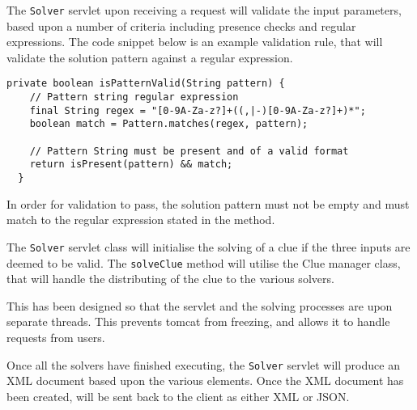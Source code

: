 The \texttt{Solver} servlet upon receiving a request will validate the input 
parameters, based upon a number of criteria including presence checks and 
regular expressions. The code snippet below is an example validation rule, that 
will validate the solution pattern against a regular expression.

\begin{lstlisting}[caption={isPatternValid deduces if a given solution pattern 
                            is valid}, label=isAjaxMethod] 
 private boolean isPatternValid(String pattern) {
    // Pattern string regular expression
    final String regex = "[0-9A-Za-z?]+((,|-)[0-9A-Za-z?]+)*";
    boolean match = Pattern.matches(regex, pattern);

    // Pattern String must be present and of a valid format
    return isPresent(pattern) && match;
  }
\end{lstlisting}

In order for validation to pass, the solution pattern must not be empty and must
match to the regular expression stated in the method.

The \texttt{Solver} servlet class will initialise the solving of a clue if the 
three inputs are deemed to be valid. The \texttt{solveClue} method will utilise 
the Clue manager class, that will handle the distributing of the clue to the 
various solvers. 

This has been designed so that the servlet and the solving processes are upon 
separate threads. This prevents tomcat from freezing, and allows it to handle 
requests from users.

Once all the solvers have finished executing, the \texttt{Solver} servlet will 
produce an XML document based upon the various elements. Once the XML document 
has been created, will be sent back to the client as either XML or JSON.
